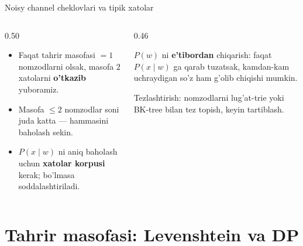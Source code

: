 \documentclass[aspectratio=169,11pt]{beamer}
\begin{document}
\begin{frame}{Noisy channel cheklovlari va tipik xatolar}
  \begin{columns}[T]
    \begin{column}{0.50\textwidth}
      \begin{tcolorbox}[warnbox,title=Cheklovlar]
        \small
        \begin{itemize}\setlength\itemsep{2pt}
          \item Faqat tahrir masofasi $=1$ nomzodlarni olsak,
                masofa $2$ xatolarni \textbf{o'tkazib} yuboramiz.
          \item Masofa $\le 2$ nomzodlar soni juda katta ---
                hammasini baholash sekin.
          \item $P(x{\mid}w)$ ni aniq baholash uchun \textbf{xatolar
                korpusi} kerak; bo'lmasa soddalashtiriladi.
        \end{itemize}
      \end{tcolorbox}
    \end{column}
    \begin{column}{0.46\textwidth}
      \begin{tcolorbox}[warnbox,title=Tipik xato]
        \small
        $P(w)$ ni \textbf{e'tibordan} chiqarish: faqat $P(x{\mid}w)$ ga
        qarab tuzatsak, kamdan-kam uchraydigan so'z ham g'olib chiqishi
        mumkin.
      \end{tcolorbox}
      \vspace{3pt}
      \footnotesize\color{halfgray}
      Tezlashtirish: nomzodlarni lug'at-trie yoki BK-tree bilan
      tez topish, keyin tartiblash.
    \end{column}
  \end{columns}
\end{frame}

\section[Tahrir masofasi]{Tahrir masofasi: Levenshtein va DP}
\end{document}
